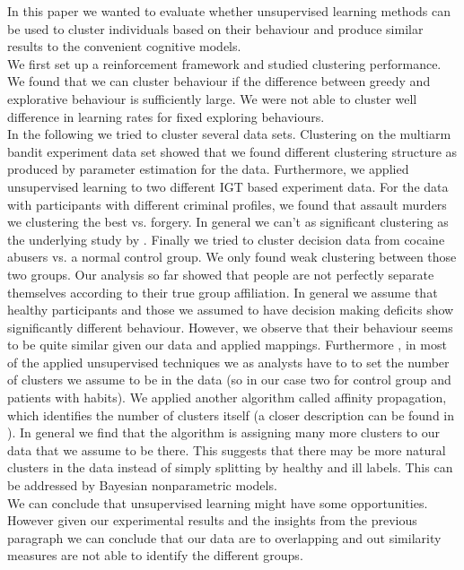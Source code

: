 \documentclass[12pt,a4paper,bibliography=totocnumbered,listof=totocnumbered]{scrartcl}
\begin{document}
{In this paper we wanted to evaluate whether unsupervised learning methods can be used to cluster individuals based on their behaviour and produce similar results to the convenient cognitive models.\\
We first set up a reinforcement framework and studied clustering performance. We found that we can cluster behaviour if the difference between greedy and explorative behaviour is sufficiently large. We were not able to cluster well difference in learning rates for fixed exploring behaviours.\\
In the following we tried to cluster several data sets. Clustering on the multiarm bandit experiment data set showed that we found different clustering structure as produced by parameter estimation for the data. Furthermore, we applied unsupervised learning to two different IGT based experiment data. For the data with participants with different criminal profiles, we found that assault murders we clustering the best vs. forgery. In general we can't as significant clustering as the underlying study by \cite{Yechiam2008}. Finally we tried to cluster decision data from cocaine abusers vs. a normal control group. We only found weak clustering between those two groups. Our analysis so far showed that people are not perfectly separate themselves according to their true group affiliation. In general we assume that healthy participants and those we assumed to have decision making deficits show significantly different behaviour. However, we observe that their behaviour seems to be quite similar given our data and applied mappings. Furthermore , in most of the applied unsupervised techniques we as analysts have to to set the number of clusters we assume to be in the data (so in our case two for control group and patients with habits). We applied another algorithm called affinity propagation, which identifies the number of clusters itself (a closer description can be found in\cite{Brusco2008} ). In general we find that the algorithm is assigning many more clusters to our data that we assume to be there. This suggests that there may be more natural clusters in the data instead of simply splitting by healthy and ill labels. This can be addressed by Bayesian nonparametric models. \cite{Gershman2012}\\
We can conclude that unsupervised learning might have some opportunities. However given our experimental results and the insights from the previous paragraph we can conclude that our data are to overlapping and out similarity measures are not able to identify the different groups. 

}
\end{document}
